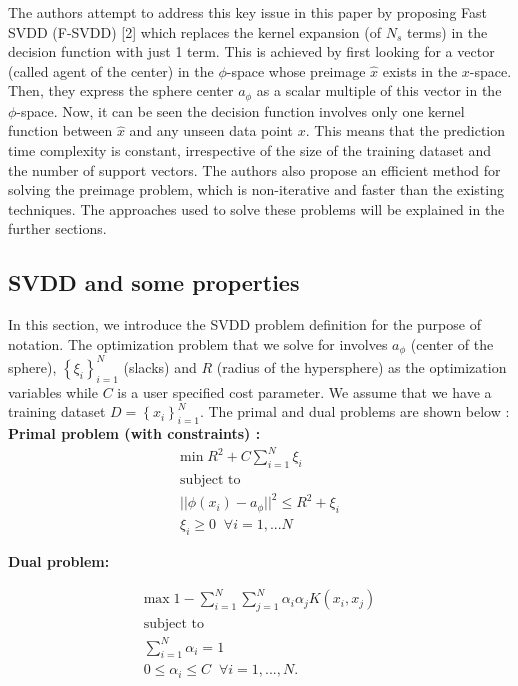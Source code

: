 \documentclass{article} %
\begin{document}
The authors attempt to address this key issue in this paper by proposing Fast SVDD (F-SVDD) [2] which replaces the kernel expansion (of $N_s$ terms) in the decision function with just 1 term. This is achieved by first looking for a vector (called agent of the center) in the $\phi$-space whose preimage $\hat{x}$ exists in the $x$-space. Then, they express the sphere center $a_{\phi}$ as a scalar multiple of this vector in the $\phi$-space. Now, it can be seen the decision function involves only one kernel function between $\hat{x}$ and any unseen data point $x$. This means that the prediction time complexity is constant, irrespective of the size of the training dataset and the number of support vectors. The authors also propose an efficient method for solving the preimage problem, which is non-iterative and faster than the existing techniques. The approaches used to solve these problems will be explained in the further sections.


\subsection{SVDD and some properties}
In this section, we introduce the SVDD problem definition for the purpose of notation. The optimization problem that we solve for involves $a_\phi$ (center of the sphere), $\left\lbrace \xi_i \right\rbrace_{i=1}^N$ (slacks) and $R$ (radius of the hypersphere) as the optimization variables while $C$ is a user specified cost parameter. We assume that we have a training dataset $D = \left\lbrace x_i \right\rbrace_{i=1}^N$.
The primal and dual problems are shown below :
\\[10pt]

\textbf{Primal problem (with constraints) :}
\begin{equation}
\begin{split}
\text{min} \; R^2 + C \sum\limits_{i=1}^N \xi_i \\
\text{subject to}\\
||\phi(x_i) - a_{\phi}||^2  \leq R^2 + \xi_i \\
\xi_i \geq 0 \;\; \forall i = 1,...N
\end{split}
\end{equation}

\textbf{Dual problem:}

\begin{equation}
\begin{split}
\text{max}\; 1 - \sum\limits_{i=1}^N \sum\limits_{j=1}^N \alpha_i \alpha_j K(x_i,x_j) \\
\text{subject to}  \\
\sum\limits_{i = 1}^N \alpha_i  = 1  \\
0 \leq \alpha_i \leq C \;\; \forall  i = 1,...,N.  
\end{split}
\end{equation}
\end{document}
